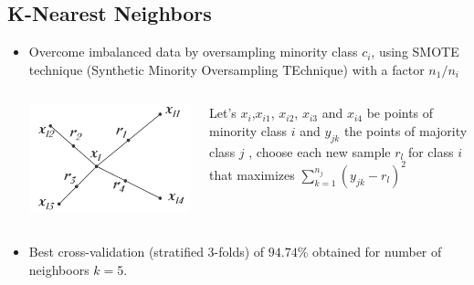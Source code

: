 \documentclass[c]{beamer}
\begin{document}
\subsection{K-Nearest Neighbors}
\begin{frame}
\tableofcontents[currentsubsection]
\end{frame}

\begin{frame}
\begin{itemize}
 \item Overcome imbalanced data by oversampling minority class $c_{i}$, using SMOTE technique (Synthetic Minority Oversampling TEchnique) with a factor $n_{1}/n_{i}$
      \begin{columns}
      \begin{column}{0.5\textwidth}
      \centering\vfill
      \includegraphics[scale=0.17]{images/oversampling/smote.png}
      \end{column}
      \begin{column}{0.5\textwidth}
      {\tiny
      Let's $x_{i}$,$x_{i1}$, $x_{i2}$, $x_{i3}$ and $x_{i4}$ be points of minority class $i$ and $y_{jk}$ the points of 
      majority class $j$ , choose each new sample $r_{l}$ for class $i$ that maximizes $\sum \limits_{\underset{}{k=1}}^{n_{j}} (y_{jk}-r_{l})^2$
      }
      \end{column}
    \end{columns}
  \item Best cross-validation (stratified 3-folds) of $94.74$\% obtained for number of neighboors $k = 5$. 
 \end{itemize}
\end{frame}
\end{document}
